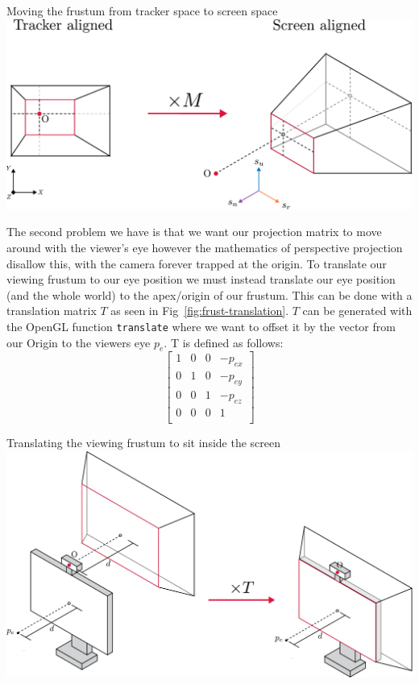 \begin{figureBox}[label={fig:basis-change}, width=0.8\linewidth]{Moving the frustum from tracker space to screen space}
    \includegraphics[width = 0.8\linewidth]{./background/figures/projection/realignment.pdf}
\end{figureBox}

The second problem we have is that we want our projection matrix to move around with the viewer's eye however the mathematics of perspective projection disallow this, with the camera forever trapped at the origin. To translate our viewing frustum to our eye position we must instead translate our eye position (and the whole world) to the apex/origin of our frustum. This can be done with a translation matrix $T$ as seen in Fig~\ref{fig:frust-translation}. $T$ can be generated with the OpenGL function \texttt{translate} where we want to offset it by the vector from our Origin to the viewers eye $p_e$. T is defined as follows:
\[
    \begin{bmatrix}
        1 & 0 & 0 & -p_{ex} \\
        0 & 1 & 0 & -p_{ey} \\
        0 & 0 & 1 & -p_{ez} \\
        0 & 0 & 0 & 1       \\
    \end{bmatrix}
\]

\begin{figureBox}[label={fig:frust-translation}, width=0.8\linewidth]{Translating the viewing frustum to sit inside the screen}
    \includegraphics[width = 0.8\linewidth]{./background/figures/projection/frust-translation.pdf}
\end{figureBox}

